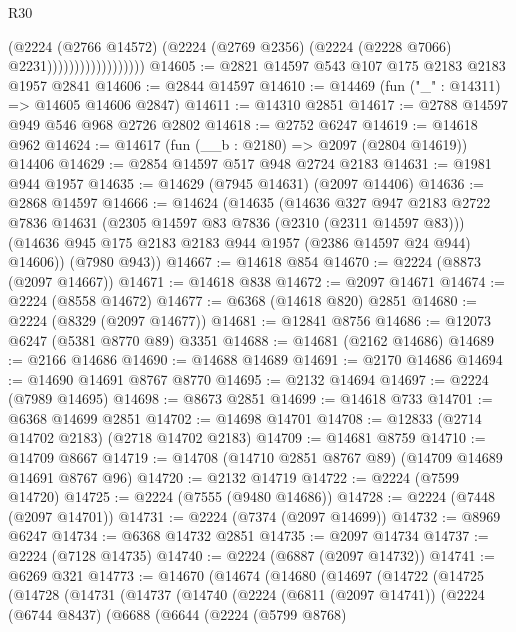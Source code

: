 \begin{lexlean}{R30}
\begin{coremodule}
                                  (@2224
                                    (@2766 @14572)
                                    (@2224
                                      (@2769 @2356)
                                      (@2224 (@2228 @7066) @2231))))))))))))))))))
@14605 := @2821 @14597 @543 @107 @175 @2183 @2183 @1957 @2841
@14606 := @2844 @14597
@14610 := @14469 (fun ("_" : @14311) => @14605 @14606 @2847)
@14611 := @14310 @2851
@14617 := @2788 @14597 @949 @546 @968 @2726 @2802
@14618 := @2752 @6247
@14619 := @14618 @962
@14624 := @14617 (fun (__b : @2180) => @2097 (@2804 @14619)) @14406
@14629 := @2854 @14597 @517 @948 @2724 @2183
@14631 := @1981 @944 @1957
@14635 := @14629 (@7945 @14631) (@2097 @14406)
@14636 := @2868 @14597
@14666 := @14624
    (@14635
      (@14636
        @327
        @947
        @2183
        @2722
        @7836
        @14631
        (@2305 @14597 @83 @7836 (@2310 (@2311 @14597 @83)))
        (@14636 @945 @175 @2183 @2183 @944 @1957 (@2386 @14597 @24 @944) @14606))
      (@7980 @943))
@14667 := @14618 @854
@14670 := @2224 (@8873 (@2097 @14667))
@14671 := @14618 @838
@14672 := @2097 @14671
@14674 := @2224 (@8558 @14672)
@14677 := @6368 (@14618 @820) @2851
@14680 := @2224 (@8329 (@2097 @14677))
@14681 := @12841 @8756
@14686 := @12073 @6247 (@5381 @8770 @89) @3351
@14688 := @14681 (@2162 @14686)
@14689 := @2166 @14686
@14690 := @14688 @14689
@14691 := @2170 @14686
@14694 := @14690 @14691 @8767 @8770
@14695 := @2132 @14694
@14697 := @2224 (@7989 @14695)
@14698 := @8673 @2851
@14699 := @14618 @733
@14701 := @6368 @14699 @2851
@14702 := @14698 @14701
@14708 := @12833 (@2714 @14702 @2183) (@2718 @14702 @2183)
@14709 := @14681 @8759
@14710 := @14709 @8667
@14719 := @14708 (@14710 @2851 @8767 @89) (@14709 @14689 @14691 @8767 @96)
@14720 := @2132 @14719
@14722 := @2224 (@7599 @14720)
@14725 := @2224 (@7555 (@9480 @14686))
@14728 := @2224 (@7448 (@2097 @14701))
@14731 := @2224 (@7374 (@2097 @14699))
@14732 := @8969 @6247
@14734 := @6368 @14732 @2851
@14735 := @2097 @14734
@14737 := @2224 (@7128 @14735)
@14740 := @2224 (@6887 (@2097 @14732))
@14741 := @6269 @321
@14773 := @14670
    (@14674
      (@14680
        (@14697
          (@14722
            (@14725
              (@14728
                (@14731
                  (@14737
                    (@14740
                      (@2224
                        (@6811 (@2097 @14741))
                        (@2224
                          (@6744 @8437)
                          (@6688
                            (@6644
                              (@2224
                                (@5799 @8768)

\end{coremodule}
\end{lexlean}
